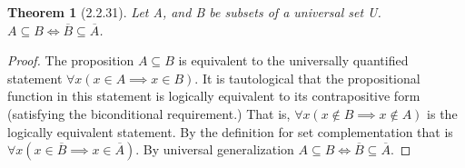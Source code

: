 \documentclass[a4paper, 12pt]{article}
\theoremstyle{plain}
\newtheorem*{theorem*}{Theorem}
\begin{document}
	
	\begin{theorem*}[2.2.31]
		Let A, and B be subsets of a universal set U. \newline 
		$A \subseteq B \iff \overline{B} \subseteq \overline{A}$.
	\end{theorem*}
	
	\begin{proof}
		The proposition $A \subseteq B$ is equivalent to the universally quantified statement 
		$\forall x ( x \in A \implies x \in B)$. It is tautological that the propositional 
		function in this statement is logically equivalent to its contrapositive form 
		(satisfying the biconditional requirement.) That is,  
		$\forall x (x \notin B \implies x \notin A)$ is the logically equivalent statement. 
		By the definition for set complementation that is 
		$\forall x (x \in \overline{B} \implies x \in \overline{A})$. By universal generalization 
		\newline $A \subseteq B \iff \overline{B} \subseteq \overline{A}$.
	\end{proof}
\end{document}
